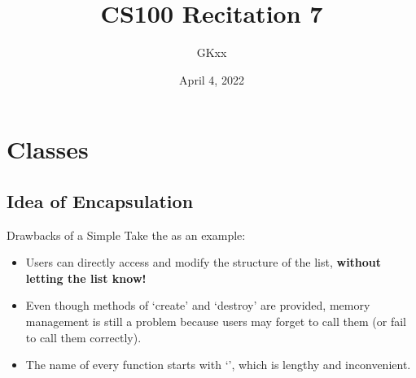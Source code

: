 \documentclass{beamer}
\title{CS100 Recitation 7}
\author{GKxx}
\date{April 4, 2022}
\begin{document}
\begin{frame}
    \maketitle
\end{frame}

\section{Classes}

\subsection{Idea of Encapsulation}

\begin{frame}{Drawbacks of a Simple \struct}
    Take the  as an example:
    \begin{itemize}
        \item Users can directly access and modify the structure of the list, \textbf{without letting the list know!}
        \item Even though methods of `create' and `destroy' are provided, memory management is still a problem because users may forget to call them (or fail to call them correctly).
        \item The name of every function starts with `', which is lengthy and inconvenient.
    \end{itemize}
\end{frame}
\end{document}
